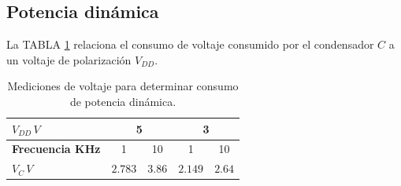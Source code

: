 \documentclass[twocolumn]{IEEEtran}
\begin{document}
\subsection{Potencia dinámica}
\noindent
La TABLA \ref{tab5} relaciona el consumo de voltaje consumido por el condensador $C$ a un voltaje de polarización $V_{DD}$.
\begin{table}[H]
  \caption{Mediciones de voltaje para determinar consumo de potencia dinámica.}
    \begin{tabular}{|l|c|c|c|c|}\hline
      $V_{DD}\, V$ & \multicolumn{2}{c|}{\textbf{5}}  & \multicolumn{2}{c|}{\textbf{3}} \\ \hline
      \textbf{Frecuencia KHz} & 1 & 10 & 1 & 10 \\ \hline
      $V_C\, V$ & $2.783$ & $3.86$ & $2.149$ & $2.64$ \\ \hline
    \end{tabular}
  \label{tab5}
\end{table}
\end{document}
